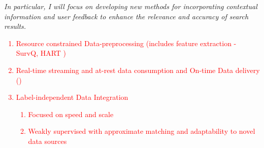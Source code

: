 \documentclass[9pt]{article}
\begin{document}
\textit{In particular, I will focus on developing new methods for incorporating contextual information and user feedback to enhance the relevance and accuracy of search results.}

\textcolor{red}{
\begin{enumerate}[label=(\roman*)]
    \item Resource constrained Data-preprocessing (includes feature extraction - SurvQ, HART \cite{stonebraker2020surveillance, solaiman2022femmir}) 
    \item Real-time streaming and at-rest data consumption and On-time Data delivery (\cite{palacios2019wip, stonebraker2020surveillance})
    \item Label-independent Data Integration
    \begin{enumerate}
        \item Focused on speed and scale \cite{solaiman2021applying}
        \item Weakly supervised with approximate matching and adaptability to novel data sources \cite{solaiman2022femmir, solaiman2022open}
    \end{enumerate}
\end{enumerate}
}
\end{document}
